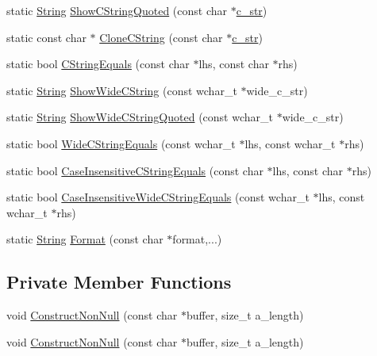 \begin{DoxyCompactItemize}
static \hyperlink{classtesting_1_1internal_1_1String}{\-String} \hyperlink{classtesting_1_1internal_1_1String_a910c20eb577df2eb065d1a89db081c9f}{\-Show\-C\-String\-Quoted} (const char $\ast$\hyperlink{classtesting_1_1internal_1_1String_a89da6be964480b4c86334e4e337d3cf2}{c\-\_\-str})
\item 
static const char $\ast$ \hyperlink{classtesting_1_1internal_1_1String_aa20b7448d8ff8e8bc66d397abd5f95c7}{\-Clone\-C\-String} (const char $\ast$\hyperlink{classtesting_1_1internal_1_1String_a89da6be964480b4c86334e4e337d3cf2}{c\-\_\-str})
\item 
static bool \hyperlink{classtesting_1_1internal_1_1String_ab275475084d8a27e8474369c309fab19}{\-C\-String\-Equals} (const char $\ast$lhs, const char $\ast$rhs)
\item 
static \hyperlink{classtesting_1_1internal_1_1String}{\-String} \hyperlink{classtesting_1_1internal_1_1String_a0d8a6b6b8bf7ae0d1c7e8139f68ce263}{\-Show\-Wide\-C\-String} (const wchar\-\_\-t $\ast$wide\-\_\-c\-\_\-str)
\item 
static \hyperlink{classtesting_1_1internal_1_1String}{\-String} \hyperlink{classtesting_1_1internal_1_1String_ae04dc0538375f8d0f2822f386b1d7fd5}{\-Show\-Wide\-C\-String\-Quoted} (const wchar\-\_\-t $\ast$wide\-\_\-c\-\_\-str)
\item 
static bool \hyperlink{classtesting_1_1internal_1_1String_a8c4b6f2a74721fdf34054b4ccf16ce7b}{\-Wide\-C\-String\-Equals} (const wchar\-\_\-t $\ast$lhs, const wchar\-\_\-t $\ast$rhs)
\item 
static bool \hyperlink{classtesting_1_1internal_1_1String_ade87a06633f3d47bf0ebecd97d6bbe8a}{\-Case\-Insensitive\-C\-String\-Equals} (const char $\ast$lhs, const char $\ast$rhs)
\item 
static bool \hyperlink{classtesting_1_1internal_1_1String_a58f4480d162352d6300278fc41f9d1f6}{\-Case\-Insensitive\-Wide\-C\-String\-Equals} (const wchar\-\_\-t $\ast$lhs, const wchar\-\_\-t $\ast$rhs)
\item 
static \hyperlink{classtesting_1_1internal_1_1String}{\-String} \hyperlink{classtesting_1_1internal_1_1String_a711e31fcf92b3fd50a679f94855b0c83}{\-Format} (const char $\ast$format,...)
\end{DoxyCompactItemize}
\subsection*{\-Private \-Member \-Functions}
\begin{DoxyCompactItemize}
\item 
void \hyperlink{classtesting_1_1internal_1_1String_ad3dd71ac6cbc792f5893b37ad3f33a65}{\-Construct\-Non\-Null} (const char $\ast$buffer, size\-\_\-t a\-\_\-length)
\item 
void \hyperlink{classtesting_1_1internal_1_1String_ad3dd71ac6cbc792f5893b37ad3f33a65}{\-Construct\-Non\-Null} (const char $\ast$buffer, size\-\_\-t a\-\_\-length)
\end{DoxyCompactItemize}

